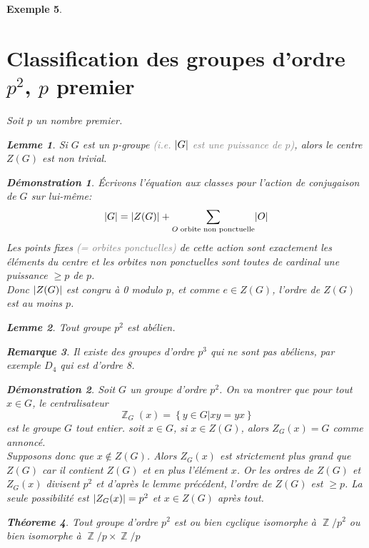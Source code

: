 \documentclass[a4paper, oneside]{report}
\theoremstyle{break}
\newtheorem{thm}{Théoreme}[section] %
\newtheorem{lemme}[thm]{Lemme}
\newtheorem{exemple}[thm]{Exemple}
\newtheorem{remarque}[thm]{Remarque}
\newtheorem*{demonstration}{Démonstration}
\newcommand{\gray}[1]{\textcolor{gray}{#1}}
\DeclareMathOperator{\Z}{\mathbb{Z}}
\DeclarePairedDelimiter\ens{\left\{ }{\right\} }%
\DeclarePairedDelimiter\abs{\lvert}{\rvert}%
\renewcommand{\ens}[1]{\left\{ #1 \right\} }%
\newcommand{\Ens}{\ens}
\begin{document}
\begin{exemple}
\section{Classification des groupes d'ordre \texorpdfstring{$p^2$, $p$ premier}{L}}

Soit $p$ un nombre premier.

\begin{lemme}
Si $G$ est un $p$-groupe \gray{(i.e. $\abs{G}$ est une puissance de $p$)}, alors le centre $Z(G)$ est non trivial.
\end{lemme}

\begin{demonstration}
Écrivons l'équation aux classes pour l'action de conjugaison de $G$ sur lui-même:
\[
\abs{G} = \abs{Z(G)} + \sum_{O \;\text{orbite non ponctuelle}} \abs{O}
\]
Les points fixes \gray{(= orbites ponctuelles)} de cette action sont exactement les éléments du centre et les orbites non ponctuelles sont toutes de cardinal une puissance $\geq p$ de $p$.\\
Donc $\abs{Z(G)}$ est congru à 0 modulo $p$, et comme $e \in Z(G)$, l'ordre de $Z(G)$ est au moins $p$.
\end{demonstration}

\begin{lemme}
Tout groupe $p^2$ est abélien.
\end{lemme}

\begin{remarque}
Il existe des groupes d'ordre $p^3$ qui ne sont pas abéliens, par exemple $D_4$ qui est d'ordre 8.
\end{remarque}

\begin{demonstration}
Soit $G$ un groupe d'ordre $p^2$. On va montrer que pour tout $x \in G$, le centralisateur 
\[
\Z_G(x) = \Ens{y \in G \big| xy = yx}
\]
est le groupe $G$ tout entier. soit $x \in G$, si $x \in Z(G)$, alors $Z_G(x) = G$ comme annoncé.\\
Supposons donc que $x \notin Z(G)$. Alors $Z_G(x)$ est strictement plus grand que $Z(G)$ car il contient $Z(G)$ et en plus l'élément $x$. Or les ordres de $Z(G)$ et $Z_G(x)$ divisent $p^2$ et d'après le lemme précédent, l'ordre de $Z(G)$ est $\geq p$. La seule possibilité est $\abs{Z_G(x)} = p^2$ et $x \in Z(G)$ après tout.
\end{demonstration}

\begin{thm}
Tout groupe d'ordre $p^2$ est ou bien cyclique isomorphe à $\Z/p^2$ ou bien isomorphe à $\Z/p \times \Z/p$
\end{thm}


\end{exemple}
\end{document}
